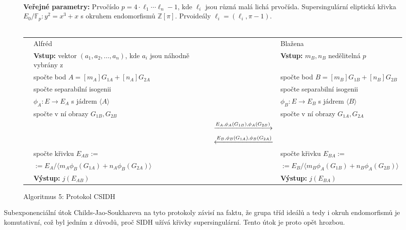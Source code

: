 \documentclass[12pt]{report}
\begin{document}
\begin{figure}[h]
\begin{center} 
\makebox[1cm]{\rule{17.3cm}{0.4pt}}\\
\hspace{-1.35cm} \textbf{Veřejné parametry:} Prvočíslo $p = 4 \cdot \ell_1 \cdots \ell_n - 1$, kde $\ell_i$ jsou různá malá lichá prvočísla. Supersingulární eliptická křivka $E_0/\mathbb{F}_p : y^2 = x^3+x$ s okruhem endomorfismů $\mathbb{Z}[\pi]$. Prvoideály $\ell_i = (\ell_i, \pi - 1)$.\\

\vspace{-0.25cm}
\makebox[\linewidth]{\rule{17.3cm}{0.4pt}}\\
\vspace{0.2cm}
\hspace*{-1cm}\begin{tabular}{l l c l}
 \cline{2-2} \cline{4-4} 
& Alfréd & & Blažena \\ 
\cline{2-2} \cline{4-4} 
& \textbf{Vstup:} vektor $(a_1,a_2,\dots,a_n)$, kde $a_i$ jsou náhodně vybrány z   & & \textbf{Vstup:} $m_B,n_B$ nedělitelná $p$ \\
&spočte bod $A = [m_A]G_{1A}+[n_A]G_{2A}$ & & spočte bod $B = [m_B]G_{1B}+[n_B]G_{2B}$\\
&spočte separabilní isogenii& &spočte separabilní isogenii\\
&$\phi_A : E \longrightarrow E_A$ s jádrem $\langle A\rangle$ & &$\phi_B : E \longrightarrow E_B$ s jádrem $\langle B\rangle$\\
&spočte v ní obrazy $G_{1B},G_{2B}$& &spočte  v ní obrazy $G_{1A},G_{2A}$\\
 & & $\xlongrightarrow{E_A, \phi_A (G_{1B}), \phi_A (G_{2B})}$  &  \\
&  & $\xlongleftarrow{E_B, \phi_B (G_{1A}), \phi_B (G_{2A})} $ &  \\
& spočte křivku $E_{AB}$ := & & spočte křivku $E_{BA} :=$\\
& $:= E_A/\langle m_A \phi_B (G_{1A})+ n_A \phi_B (G_{2A}) \rangle$ &  & $ := E_B/\langle m_B \phi_A (G_{1B})+ n_B \phi_A (G_{2B}) \rangle$ \\
& \textbf{Výstup:} $j(E_{AB})$ & & \textbf{Výstup:} $j(E_{BA})$
\end{tabular}
\caption*{Algoritmus 5: Protokol CSIDH}
\end{center}
\end{figure}




 Subexponenciální útok Childs-Jao-Soukhareva \cite{Childs} na tyto protokoly závisí na faktu, že grupa tříd ideálů a tedy i okruh endomorfismů je komutativní, což byl jedním z důvodů, proč SIDH užívá křivky supersingulární. Tento útok je proto opět hrozbou. 
\end{document}
